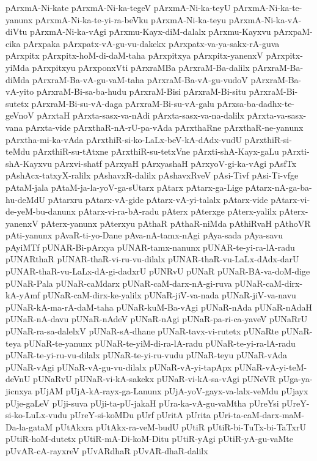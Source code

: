 {pArxmA-Ni-kate
pArxmA-Ni-ka-tegeV
pArxmA-Ni-ka-teyU
pArxmA-Ni-ka-te-yanunx
pArxmA-Ni-ka-te-yi-ra-beVku
pArxmA-Ni-ka-teyu
pArxmA-Ni-ka-vA-diVtu
pArxmA-Ni-ka-vAgi
pArxmu-Kayx-diM-dalalx
pArxmu-Kayxvu
pArxpaM-cika
pArxpaka
pArxpatx-vA-gu-vu-dakekx
pArxpatx-va-ya-sakx-rA-guva
pArxpitx
pArxpitx-hoM-di-daM-taha
pArxpitxya
pArxpitx-yanenxV
pArxpitx-yiMda
pArxpitxyu
pArxponxVti
pArxraMBa
pArxraM-Ba-dalilx
pArxraM-Ba-diMda
pArxraM-Ba-vA-gu-vaM-taha
pArxraM-Ba-vA-gu-vudoV
pArxraM-Ba-vA-yito
pArxraM-Bi-sa-ba-hudu
pArxraM-Bisi
pArxraM-Bi-situ
pArxraM-Bi-sutetx
pArxraM-Bi-su-vA-daga
pArxraM-Bi-su-vA-galu
pArxsa-ba-dadhx-te-geVnoV
pArxtaH
pArxta-sasx-va-nAdi
pArxta-sasx-va-na-dalilx
pArxta-va-sasx-vana
pArxta-vide
pArxthaR-nA-rU-pa-vAda
pArxthaRne
pArxthaR-ne-yanunx
pArxtha-mi-ka-vAda
pArxthiR-si-ko-LaLx-beV-kA-dAdx-vudU
pArxthiR-si-teMdu
pArxthiR-su-tAtxne
pArxthiR-su-tetxVne
pArxti-shA-Kayx-gaLu
pArxti-shA-Kayxvu
pArxvi-shatf
pArxyaH
pArxyashaH
pArxyoV-gi-ka-vAgi
pAsfTx
pAshAcx-tatxyX-ralilx
pAshavxR-dalilx
pAshavxRveV
pAsi-Tivf
pAsi-Ti-vfge
pAtaM-jala
pAtaM-ja-la-yoV-ga-sUtarx
pAtarx
pAtarx-ga-Lige
pAtarx-nA-ga-ba-hu-deMdU
pAtarxru
pAtarx-vA-gide
pAtarx-vA-yi-talalx
pAtarx-vide
pAtarx-vi-de-yeM-bu-danunx
pAtarx-vi-ra-bA-radu
pAterx
pAterxge
pAterx-yalilx
pAterx-yanenxV
pAterx-yanunx
pAterxyu
pAthaR
pAthaR-niMda
pAthiRvaH
pAthoVR
pAti-yanunx
pAvaR-ti-yo-Dane
pAva-nA-tamx-nAgi
pAya-sada
pAya-savu
pAyiMTf
pUNAR-Bi-pArxya
pUNAR-tamx-nanunx
pUNAR-te-yi-ra-lA-radu
pUNARthaR
pUNAR-thaR-vi-ru-vu-dilalx
pUNAR-thaR-vu-LaLx-dAdx-darU
pUNAR-thaR-vu-LaLx-dA-gi-dadxrU
pUNRvU
pUNaR
pUNaR-BA-va-doM-dige
pUNaR-Pala
pUNaR-caMdarx
pUNaR-caM-darx-nA-gi-ruva
pUNaR-caM-dirx-kA-yAmf
pUNaR-caM-dirx-ke-yalilx
pUNaR-jiV-va-nada
pUNaR-jiV-va-navu
pUNaR-kA-ma-rA-daM-taha
pUNaR-kuM-Ba-vAgi
pUNaR-nAda
pUNaR-nAdaH
pUNaR-nA-davu
pUNaR-nAdeV
pUNaR-nAgi
pUNaR-pa-ri-ca-yaveV
pUNaRrU
pUNaR-ra-sa-dalelxV
pUNaR-sA-dhane
pUNaR-tavx-vi-rutetx
pUNaRte
pUNaR-teya
pUNaR-te-yanunx
pUNaR-te-yiM-di-ra-lA-radu
pUNaR-te-yi-ra-lA-radu
pUNaR-te-yi-ru-vu-dilalx
pUNaR-te-yi-ru-vudu
pUNaR-teyu
pUNaR-vAda
pUNaR-vAgi
pUNaR-vA-gu-vu-dilalx
pUNaR-vA-yi-tapApx
pUNaR-vA-yi-teM-deVnU
pUNaRvU
pUNaR-vi-kA-sakekx
pUNaR-vi-kA-sa-vAgi
pUNeVR
pUga-ya-jicnxya
pUjAM
pUjA-kA-rayx-ga-Lanunx
pUjA-yoV-gayx-va-lalx-veMdu
pUjayx
pUje-gaLeV
pUji-suva
pUji-ta-pU-jakaH
pUra-ka-vA-gu-vaMtha
pUreYsi
pUreY-si-ko-LuLx-vudu
pUreY-si-koMDu
pUrf
pUritA
pUrita
pUri-ta-caM-darx-maM-Da-la-gataM
pUtAkxra
pUtAkx-ra-veM-budU
pUtiR
pUtiR-bi-TuTx-bi-TaTxrU
pUtiR-hoM-dutetx
pUtiR-mA-Di-koM-Ditu
pUtiR-yAgi
pUtiR-yA-gu-vaMte
pUvAR-cA-rayxreV
pUvARdhaR
pUvAR-dhaR-dalilx
}
